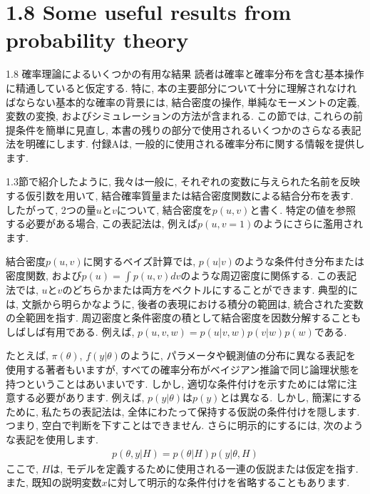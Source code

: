 \documentclass[10pt,dvipdfmx,a4]{beamer}
\newcommand{\eqn}[1]{\begin{align*}#1\end{align*}}
\begin{document}
\section{1.8 Some useful results from probability theory}
\begin{frame}{1.8 確率理論によるいくつかの有用な結果}
読者は確率と確率分布を含む基本操作に精通していると仮定する.
特に, 本の主要部分について十分に理解されなければならない基本的な確率の背景には, 結合密度の操作, 単純なモーメントの定義, 変数の変換, およびシミュレーションの方法が含まれる.
この節では, これらの前提条件を簡単に見直し, 本書の残りの部分で使用されるいくつかのさらなる表記法を明確にします.
付録Aは, 一般的に使用される確率分布に関する情報を提供します.

1.3節で紹介したように, 我々は一般に, それぞれの変数に与えられた名前を反映する仮引数を用いて, 結合確率質量または結合密度関数による結合分布を表す.
したがって, 2つの量$u$と$v$について, 結合密度を$p(u,v)$と書く.
特定の値を参照する必要がある場合, この表記法は, 例えば$p(u,v=1)$のようにさらに濫用されます.
\end{frame}


\begin{frame}
結合密度$p(u,v)$に関するベイズ計算では, $p(u|v)$のような条件付き分布または密度関数, および$p(u)=\int p(u,v) dv$のような周辺密度に関係する.
この表記法では, $u$と$v$のどちらかまたは両方をベクトルにすることができます.
典型的には, 文脈から明らかなように, 後者の表現における積分の範囲は, 統合された変数の全範囲を指す.
周辺密度と条件密度の積として結合密度を因数分解することもしばしば有用である.
例えば, $p(u,v,w)=p(u|v,w)p(v|w)p(w)$である.

たとえば, $\pi(\theta)$, $f(y|\theta)$のように, パラメータや観測値の分布に異なる表記を使用する著者もいますが, すべての確率分布がベイジアン推論で同じ論理状態を持つということはあいまいです.
しかし, 適切な条件付けを示すためには常に注意する必要があります.
例えば, $p(y|\theta)$は$p(y)$とは異なる.
しかし, 簡潔にするために, 私たちの表記法は, 全体にわたって保持する仮説の条件付けを隠します.
つまり, 空白で判断を下すことはできません.
さらに明示的にするには, 次のような表記を使用します.
\eqn{p(\theta,y|H)=p(\theta|H)p(y|\theta,H)}
ここで, $H$は, モデルを定義するために使用される一連の仮説または仮定を指す.
また, 既知の説明変数$x$に対して明示的な条件付けを省略することもあります.
\end{frame}

\end{document}
